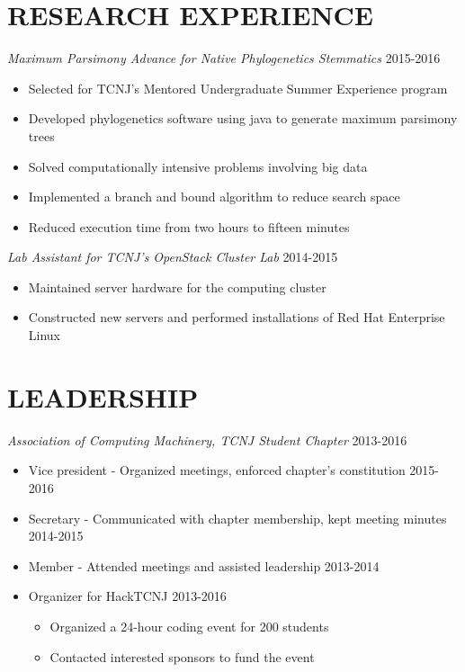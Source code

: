 \documentclass[line,overlap]{res}
\begin{document}
\begin{resume}
\section{RESEARCH EXPERIENCE}

	\textit{Maximum Parsimony Advance for Native Phylogenetics Stemmatics} \hfill 2015-2016 
	\begin{itemize}
		\item Selected for TCNJ's Mentored Undergraduate Summer Experience program
		\item Developed phylogenetics software using java to generate maximum parsimony trees
		\item Solved computationally intensive problems involving big data
		\item Implemented a branch and bound algorithm to reduce search space
		\item Reduced execution time from two hours to fifteen minutes
	\end{itemize}
	
	\textit{Lab Assistant for TCNJ's OpenStack Cluster Lab} \hfill 2014-2015
	\begin{itemize}
		\item Maintained server hardware for the computing cluster
		\item Constructed new servers and performed installations of Red Hat Enterprise Linux
	\end{itemize}
\section{LEADERSHIP}
	\textit{Association of Computing Machinery, TCNJ Student Chapter} \hfill 2013-2016
	\begin{itemize}
		\item Vice president - Organized meetings, enforced chapter's constitution   \hfill 2015-2016
		\item Secretary - Communicated with chapter membership, kept meeting minutes \hfill 2014-2015
		\item Member - Attended meetings and assisted leadership                     \hfill 2013-2014 
		\item Organizer for HackTCNJ                                                 \hfill 2013-2016
			\begin{itemize}
				\item Organized a 24-hour coding event for 200 students 
				\item Contacted interested sponsors to fund the event
			\end{itemize}
	\end{itemize}
\end{resume}
\end{document}
